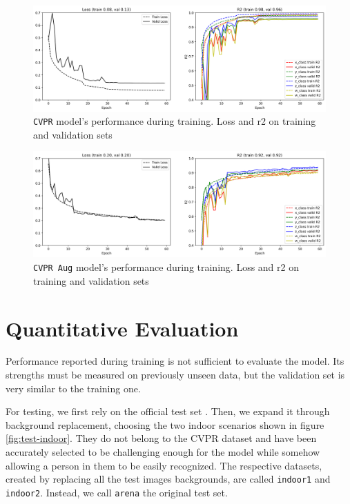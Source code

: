 \begin{figure}[H]
	\centering
	\includegraphics[width=1 \textwidth]{"contents/images/06-training-CVPR"}
	\caption[\texttt{CVPR} model's performance during training. Loss and \gls{r2} on training and validation sets]{\texttt{CVPR} model's performance during training. Loss and \gls{r2} on training and validation sets}
	\label{fig:training-metrics-cvpr}
\end{figure}

\begin{figure}[H]
	\centering
	\includegraphics[width=1 \textwidth]{"contents/images/06-training-CVPRaug"}
	\caption[\texttt{CVPR Aug} model's performance during training. Loss and \gls{r2} on training and validation sets]{\texttt{CVPR Aug} model's performance during training. Loss and \gls{r2} on training and validation sets}
	\label{fig:training-metrics-cvpraug}
\end{figure}




\section{Quantitative Evaluation}
\label{sec:evaluation-quantitative}

Performance reported during training is not sufficient to evaluate the model. Its strengths must be measured on previously unseen data, but the validation set is very similar to the training one.

For testing, we first rely on the official test set \cite{mantegazza2019visionbased}. Then, we expand it through background replacement, choosing the two indoor scenarios shown in figure \ref{fig:test-indoor}. They do not belong to the CVPR dataset and have been accurately selected to be challenging enough for the model while somehow allowing a person in them to be easily recognized. The respective datasets, created by replacing all the test images backgrounds, are called \texttt{indoor1} and \texttt{indoor2}. Instead, we call \texttt{arena} the original test set.

